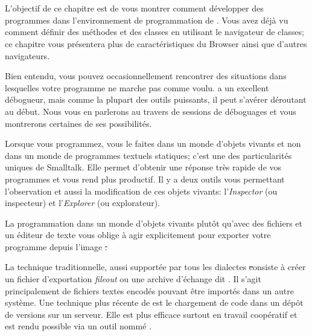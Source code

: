 \documentclass[a4paper,10pt,twoside]{book}
\begin{document}
	\sloppy
\fi

\chapter{\titreEnvironment}



L'objectif de ce chapitre est de vous montrer comment développer des programmes 
dans l'environnement de programmation de \pharo.
Vous avez déjà vu comment définir des méthodes et des classes
en utilisant le navigateur de classes; ce chapitre
vous présentera plus de caractéristiques du Browser ainsi que
d'autres navigateurs. %

Bien entendu, vous pouvez occasionnellement rencontrer
des situations dans lesquelles votre programme ne marche pas comme voulu.
\pharo a un excellent débogueur, mais comme la plupart des outils puissants, il peut s'avérer déroutant au début.
Nous vous en parlerons au travers de sessions de déboguages et vous
montrerons certaines de ses possibilités.

Lorsque vous programmez, vous le faites dans un monde d'objets vivants et
non dans un monde de programmes textuels statiques; c'est 
une des particularités uniques de Smalltalk.
Elle permet d'obtenir une réponse très rapide de vos programmes et vous rend plus productif. 
Il y a deux outils vous permettant l'observation et aussi la modification de ces objets 
vivants: l'\emph{Inspector} (ou inspecteur) et l'\emph{Explorer} (ou explorateur).

La programmation dans un monde d'objets vivants plutôt qu'avec des fichiers et un éditeur 
de texte vous oblige à agir explicitement pour exporter votre programme depuis l'image \st.

La technique traditionnelle, aussi supportée par tous les dialectes \st consiste à créer un 
fichier d'exportation \emph{fileout} ou une archive d'échange dit \changeset. Il s'agit 
principalement de fichiers textes encodés pouvant être importés dans un autre système.
Une technique plus récente de \pharo est le chargement de code dans un dépôt de versions sur un serveur.
Elle est plus efficace surtout en travail coopératif et est rendu possible via un outil nommé .
\end{document}
